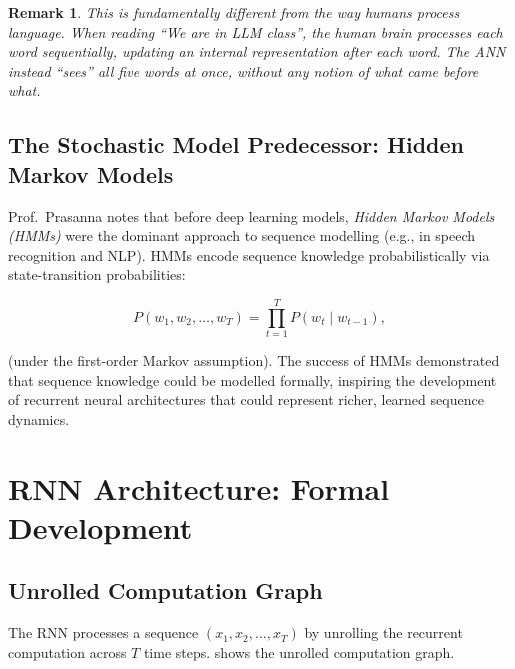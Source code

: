 \documentclass[12pt,a4paper]{article}
\newtheorem{remark}{Remark}[section]
\begin{document}
\begin{remark}
This is fundamentally different from the way humans process language.  When
reading ``We are in LLM class'', the human brain processes each word
sequentially, updating an internal representation after each word.  The ANN
instead ``sees'' all five words at once, without any notion of what came
before what.
\end{remark}

\subsection{The Stochastic Model Predecessor: Hidden Markov Models}
\label{subsec:hmm}

Prof.\ Prasanna notes that before deep learning models, \emph{Hidden Markov
Models (HMMs)} were the dominant approach to sequence modelling (e.g., in
speech recognition and NLP).  HMMs encode sequence knowledge probabilistically
via state-transition probabilities:

\begin{equation}
  \label{eq:hmm}
  P(w_1, w_2, \ldots, w_T) = \prod_{t=1}^{T} P(w_t \mid w_{t-1}),
\end{equation}

(under the first-order Markov assumption).  The success of HMMs demonstrated
that sequence knowledge could be modelled formally, inspiring the development
of recurrent neural architectures that could represent richer, learned
sequence dynamics.

\section{RNN Architecture: Formal Development}
\label{sec:rnn_formal}

\subsection{Unrolled Computation Graph}
\label{subsec:unrolled}

The RNN processes a sequence $(x_1, x_2, \ldots, x_T)$ by unrolling the
recurrent computation across $T$ time steps.  
shows the unrolled computation graph.
\end{document}
